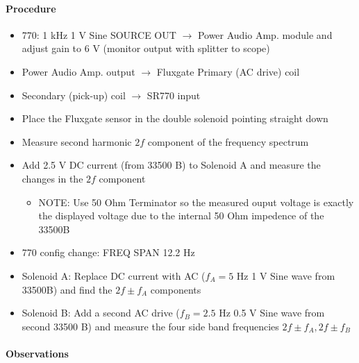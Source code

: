 \documentclass[../main.tex]{subfiles}
\begin{document}
\paragraph{Procedure}
\begin{itemize}
    \item 770: 1 kHz 1 V Sine SOURCE OUT $\to$ Power Audio Amp. module and adjust gain to 6 V (monitor output with splitter to scope)
    \item Power Audio Amp. output $\to$ Fluxgate Primary (AC drive) coil
    \item Secondary (pick-up) coil $\to$ SR770 input
    \item Place the Fluxgate sensor in the double solenoid pointing straight down   
    \item Measure second harmonic $2f$ component of the frequency spectrum
    \item Add 2.5 V DC current (from 33500 B) to Solenoid A and measure the changes in the $2f$ component
    \begin{itemize}
        \item NOTE: Use 50 Ohm Terminator so the measured ouput voltage is exactly the displayed voltage due to the internal 50 Ohm impedence of the 33500B
    \end{itemize}
    \item 770 config change: FREQ SPAN 12.2 Hz
    \item Solenoid A: Replace DC current with AC ($f_A = 5$ Hz 1 V Sine wave from 33500B) and find the $2f \pm f_A$ components
    \item Solenoid B: Add a second AC drive ($f_B = 2.5$ Hz 0.5 V Sine wave from second 33500 B) and measure the four side band frequencies $2f \pm f_A, 2f \pm f_B$
\end{itemize}

\paragraph{Observations}
\end{document}
